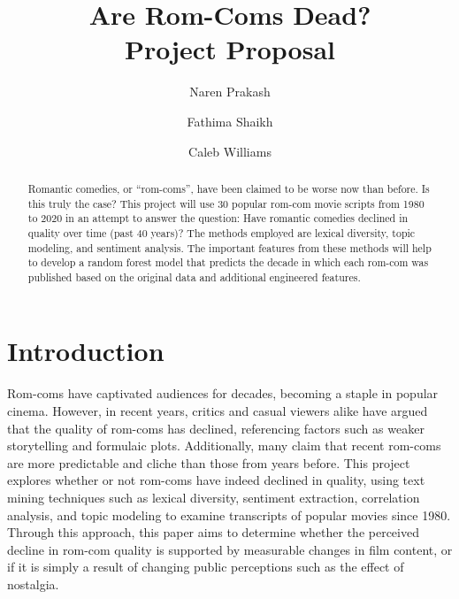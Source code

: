 \documentclass[
  authoryear,
  preprint]{elsarticle}
\begin{document}
\begin{frontmatter}
\title{Are Rom-Coms Dead? \\\large{Project Proposal} }
\author[1]{Naren Prakash%
%
}

\author[1]{Fathima Shaikh%
%
}

\author[1]{Caleb Williams%
%
}





        
\begin{abstract}
Romantic comedies, or ``rom-coms'', have been claimed to be worse now
than before. Is this truly the case? This project will use 30 popular
rom-com movie scripts from 1980 to 2020 in an attempt to answer the
question: Have romantic comedies declined in quality over time (past 40
years)? The methods employed are lexical diversity, topic modeling, and
sentiment analysis. The important features from these methods will help
to develop a random forest model that predicts the decade in which each
rom-com was published based on the original data and additional
engineered features.
\end{abstract}





\end{frontmatter}
    

\section{Introduction}\label{introduction}

Rom-coms have captivated audiences for decades, becoming a staple in
popular cinema. However, in recent years, critics and casual viewers
alike have argued that the quality of rom-coms has declined, referencing
factors such as weaker storytelling and formulaic plots. Additionally,
many claim that recent rom-coms are more predictable and cliche than
those from years before. This project explores whether or not rom-coms
have indeed declined in quality, using text mining techniques such as
lexical diversity, sentiment extraction, correlation analysis, and topic
modeling to examine transcripts of popular movies since 1980. Through
this approach, this paper aims to determine whether the perceived
decline in rom-com quality is supported by measurable changes in film
content, or if it is simply a result of changing public perceptions such
as the effect of nostalgia.
\end{document}
